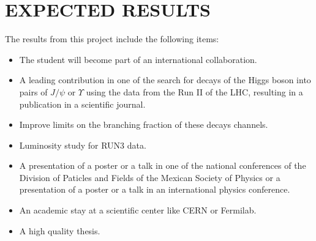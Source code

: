 \documentclass[final,3p]{CSP}
\begin{document}
\section{EXPECTED RESULTS}

\onehalfspacing The results from this project include the following items:
\begin{itemize}
\item The student will become part of an international collaboration.
\item A leading contribution in one of the search for decays of the Higgs boson into pairs of $J/\psi$ or $\Upsilon$ using the data from the Run II of the LHC, resulting in a publication in a scientific journal.
\item Improve limits on the branching fraction of these decays channels.
\item Luminosity study for RUN3 data.
\item A presentation of a poster or a talk in one of the national conferences of the Division of Paticles and Fields of the Mexican Society of Physics or a presentation of a poster or a talk in an international physics conference.
\item An academic stay at a scientific center like CERN or Fermilab.
\item A high quality thesis.
\end{itemize}
\end{document}
